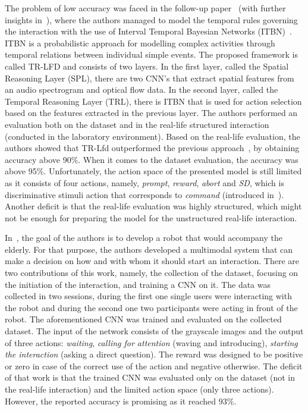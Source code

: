 \documentclass[thesis]{mas_proposal}
\begin{document}
The problem of low accuracy was faced in the follow-up paper~\cite{carpio2019learning} (with further insights in~\cite{carpio2018learning}), where the authors managed to model the temporal rules governing the interaction with the use of Interval Temporal Bayesian Networks (ITBN)~\cite{zhang2013modeling}. ITBN is a probabilistic approach for modelling complex activities through temporal relations between individual simple events. The proposed framework is called TR-LFD and consists of two layers. In the first layer, called the Spatial Reasoning Layer (SPL), there are two CNN’s that extract spatial features from an audio spectrogram and optical flow data. In the second layer, called the Temporal Reasoning Layer (TRL), there is ITBN that is used for action selection based on the features extracted in the previous layer. The authors performed an evaluation both on the dataset and in the real-life structured interaction (conducted in the laboratory environment). Based on the real-life evaluation, the authors showed that TR-Lfd outperformed the previous approach~\cite{Turner2018}, by obtaining accuracy above 90\%. When it comes to the dataset evaluation, the accuracy was above 95\%. Unfortunately, the action space of the presented model is still limited as it consists of four actions, namely, \emph{prompt}, \emph{reward}, \emph{abort} and \emph{SD}, which is discriminative stimuli action that corresponds to \emph{command} (introduced in~\cite{ClarkTurner2017}). Another deficit is that the real-life evaluation was highly structured, which might not be enough for preparing the model for the unstructured real-life interaction.

In~\cite{Romeo2018}, the goal of the authors is to develop a robot that would accompany the elderly. For that purpose, the authors developed a multimodal system that can make a decision on how and with whom it should start an interaction. There are two contributions of this work, namely, the collection of the dataset, focusing on the initiation of the interaction, and training a CNN on it. The data was collected in two sessions, during the first one single users were interacting with the robot and during the second one two participants were acting in front of the robot. The aforementioned CNN was trained and evaluated on the collected dataset. The input of the network consists of the grayscale images and the output of three actions: \emph{waiting}, \emph{calling for attention} (waving and introducing), \emph{starting the interaction} (asking a direct question). The reward was designed to be positive or zero in case of the correct use of the action and negative otherwise. The deficit of that work is that the trained CNN was evaluated only on the dataset (not in the real-life interaction) and the limited action space (only three actions). However, the reported accuracy is promising as it reached 93\%. 
\end{document}
